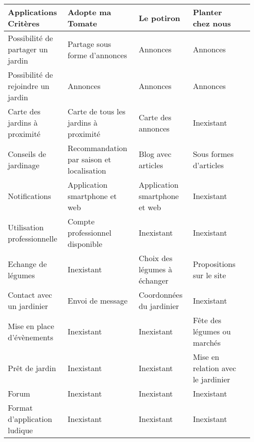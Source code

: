 \documentclass{article}
\begin{document}
\begin{tabular}{|p{3cm}|p{3cm}|p{3cm}|p{3cm}|p{3cm}|}
    \hline 
    Applications Critères & Adopte ma Tomate & Le potiron & Planter chez nous 
    \\ \hline
    Possibilité de partager un jardin & Partage sous forme d’annonces & Annonces & Annonces 
    \\ \hline
   Possibilité de rejoindre un jardin & Annonces & Annonces & Annonces  
    \\ \hline
   Carte des jardins à proximité & Carte de tous les jardins à proximité & Carte des annonces & Inexistant 
    \\ \hline
   Conseils de jardinage & Recommandation par saison et localisation & Blog avec articles & Sous formes d’articles 
    \\ \hline
    Notifications & Application smartphone et web & Application smartphone et web & Inexistant 
    \\ \hline
    Utilisation professionnelle & Compte professionnel disponible & Inexistant & Inexistant 
    \\ \hline
    Echange de légumes & Inexistant & Choix des légumes à échanger & Propositions sur le site 
    \\ \hline
    Contact avec un jardinier & Envoi de message & Coordonnées du jardinier & Inexistant 
    \\ \hline
   Mise en place d’évènements & Inexistant & Inexistant & Fête des légumes ou marchés 
    \\ \hline
    Prêt de jardin & Inexistant & Inexistant & Mise en relation avec le jardinier 
    \\ \hline
   Forum & Inexistant & Inexistant & Inexistant 
    \\ \hline
    Format d'application ludique & Inexistant & Inexistant & Inexistant 
    \\ \hline
\end{tabular}

\vspace{0.5cm} \\
\end{document}
